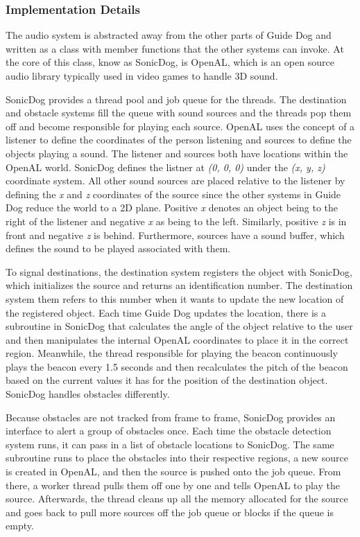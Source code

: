 \subsubsection{Implementation Details}
\label{sec:technical-audio-impl}

The audio system is abstracted away from the other parts of Guide Dog and
written as a class with member functions that the other systems can invoke. At 
the core of this class, know as SonicDog, is OpenAL\cite{openal-website}, which 
is an open source audio library typically used in video games to handle 3D
sound. 

SonicDog provides a thread pool and job queue for the threads. The destination
and obstacle systems fill the queue with sound sources and the threads pop them
off and become responsible for playing each source. OpenAL uses the concept of a
listener to define the coordinates of the person listening and sources to define
the objects playing a sound. The listener and sources both have locations within
the OpenAL world. SonicDog defines the listner at \emph{(0, 0, 0)} under the
\emph{(x, y, z)} coordinate system. All other sound sources are placed relative 
to the listener by defining the \emph{x} and \emph{z} coordinates of the source 
since the other systems in Guide Dog reduce the world to a 2D plane. Positive
\emph{x} denotes an object being to the right of the listener and negative 
\emph{x} as being to the left. Similarly, positive \emph{z} is in front and
negative \emph{z} is behind. Furthermore, sources have a sound buffer, which 
defines the sound to be played associated with them.

To signal destinations, the destination system registers the object with
SonicDog, which initializes the source and returns an identification number. 
The destination system them refers to this number when it wants to update the 
new location of the registered object. Each time Guide Dog updates the location,
there is a subroutine in SonicDog that calculates the angle of the object 
relative to the user and then manipulates the internal OpenAL coordinates to 
place it in the correct region. Meanwhile, the thread responsible for playing 
the beacon continuously plays the beacon every 1.5 seconds and then 
recalculates the pitch of the beacon based on the current values it has for the 
position of the destination object. SonicDog handles obstacles differently.

Because obstacles are not tracked from frame to frame, SonicDog provides an
interface to alert a group of obstacles once. Each time the obstacle detection
system runs, it can pass in a list of obstacle locations to SonicDog. The same
subroutine runs to place the obstacles into their respective regions, a new
source is created in OpenAL, and then the source is pushed onto the job queue.
From there, a worker thread pulls them off one by one and tells OpenAL to play
the source. Afterwards, the thread cleans up all the memory allocated for the
source and goes back to pull more sources off the job queue or blocks if the 
queue is empty.

